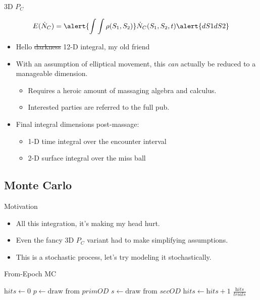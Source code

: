 \documentclass[pdf]{beamer}
\begin{document}
\begin{frame}{3D $P_C$}

  \[ E(\dot{N}_C) = \alert{\int \int \rho(S_1, S_2)} \dot{N}_C(S_1, S_2, t) \alert{dS1dS2}\]

  \begin{itemize}
  \item Hello \sout{darkness} 12-D integral, my old friend
  \item With an assumption of elliptical movement, this \emph{can} actually be
    reduced to a manageable dimension.
    \begin{itemize}
    \item Requires a heroic amount of massaging algebra and calculus.
    \item Interested parties are referred to the full pub.
    \end{itemize}
  \item Final integral dimensions post-massage:
    \begin{itemize}
    \item  1-D time integral over the encounter interval
    \item  2-D surface integral over the miss ball
    \end{itemize}
  \end{itemize}
\end{frame}



\subsection{Monte Carlo}

\begin{frame}{Motivation}
  \begin{itemize}
  \item All this integration, it's making my head hurt.
  \item Even the fancy 3D $P_C$ variant had to make simplifying assumptions.
  \item This is a stochastic process, let's try modeling it stochastically.
  \end{itemize}
\end{frame}

\begin{frame}{From-Epoch MC}
  \begin{algorithmic}
    \State $\textit{hits} \gets 0$
    \For{$i \in [0,\ldots,\textit{trials})$}
      \State $p \gets \text{draw from } \textit{primOD}$ 
      \State $s \gets \text{draw from } \textit{secOD}$
        \State $\textit{hits} \gets \textit{hits} + 1$
      \EndIf
      \EndFor
    \State \Return $\frac{\textit{hits}}{\textit{trials}}$
    \EndProcedure  
  \end{algorithmic}
\end{frame}
\end{document}
